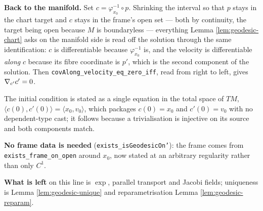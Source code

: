 \begin{lemma}
  \textbf{Back to the manifold.} Set $c = \varphi_{x_0}^{-1} \circ p$. Shrinking the interval so
  that $p$ stays in the chart target and $c$ stays in the frame's open set --- both by
  continuity, the target being open because $M$ is boundaryless --- everything
  Lemma \ref{lem:geodesic-chart} asks on the manifold side is read off the solution through the
  same identification: $c$ is differentiable because $\varphi_{x_0}^{-1}$ is, and the velocity
  is differentiable \emph{along} $c$ because its fibre coordinate is $p'$, which is the second
  component of the solution. Then \texttt{covAlong\_velocity\_eq\_zero\_iff}, read from right to
  left, gives $\nabla_{c'}c' = 0$.

  The initial condition is stated as a single equation in the total space of $TM$,
  $\langle c(0), c'(0)\rangle = \langle x_0, v_0\rangle$, which packages $c(0) = x_0$ and
  $c'(0) = v_0$ with no dependent-type cast; it follows because a trivialisation is injective on
  its source and both components match.

  \textbf{No frame data is needed} (\texttt{exists\_isGeodesicOn'}): the frame comes from
  \texttt{exists\_frame\_on\_open} around $x_0$, now stated at an arbitrary regularity rather
  than only $C^1$.

  \textbf{What is left} on this line is $\exp$, parallel transport and Jacobi fields;
  uniqueness is Lemma \ref{lem:geodesic-unique} and reparametrisation
  Lemma \ref{lem:geodesic-reparam}.
\end{lemma}

